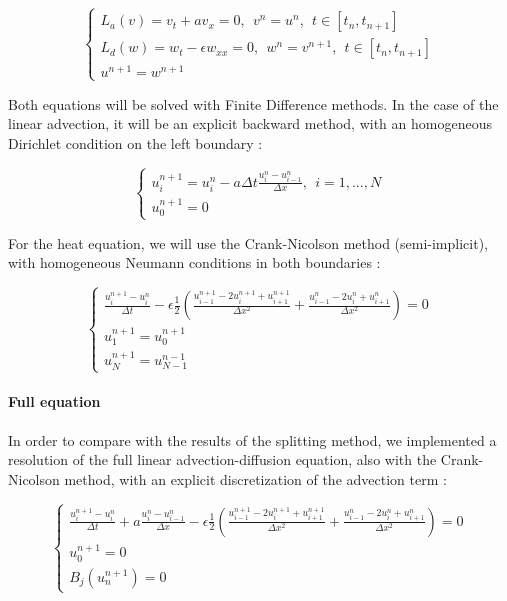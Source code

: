 \begin{equation}
	\label{eq:operatorsSplitting}
	\begin{cases}
		L_a(v) = v_t + av_x  = 0, \ \ v^n = u^n, \ \ t \in [t_n,t_{n+1}] \\
		L_d(w) = w_t - \epsilon w_{xx} = 0, \ \ w^n = v^{n+1}, \ \ t \in [t_n,t_{n+1}]  \\
		u^{n+1} = w^{n+1}
	\end{cases}	
\end{equation}

\indent Both equations will be solved with Finite Difference methods. In the case of the linear advection, it will be an explicit backward method, with an homogeneous Dirichlet condition on the left boundary :

\begin{equation}
	\begin{cases}
		u_i^{n+1} = u_i^n - a\Delta t \frac{u_i^n - u_{i-1}^n}{\Delta x}, \ \ i = 1,...,N \\
		u_0^{n+1} = 0
	\end{cases}
\end{equation}

\indent For the heat equation, we will use the Crank-Nicolson method (semi-implicit), with homogeneous Neumann conditions in both boundaries :

\begin{equation}
\begin{cases}
\frac{u_i^{n+1}-u_i^{n}}{\Delta t} - \epsilon \frac{1}{2} \left( \frac{u_{i-1}^{n+1} - 2u_i^{n+1} + u_{i+1}^{n+1}}{\Delta x^2}  + \frac{u_{i-1}^{n} - 2u_i^{n} + u_{i+1}^{n}}{\Delta x^2} \right) = 0 \\
u_1^{n+1} = u_0^{n+1} \\
u_{N}^{n+1} = u_{N-1}^{n-1} 
\end{cases}
\end{equation}

\paragraph{Full equation} In order to compare with the results of the splitting method, we implemented a resolution of the full linear advection-diffusion equation, also with the Crank-Nicolson method, with an explicit discretization of the advection term : 

\begin{equation}
\begin{cases}
\frac{u_i^{n+1}-u_i^{n}}{\Delta t}  + a\frac{u_i^n - u_{i-1}^n}{\Delta x} - \epsilon \frac{1}{2} \left( \frac{u_{i-1}^{n+1} - 2u_i^{n+1} + u_{i+1}^{n+1}}{\Delta x^2}  + \frac{u_{i-1}^{n} - 2u_i^{n} + u_{i+1}^{n}}{\Delta x^2} \right) = 0 \\
		u_0^{n+1} = 0 \\
		B_j(u_n^{n+1}) = 0
\end{cases}
\end{equation}

